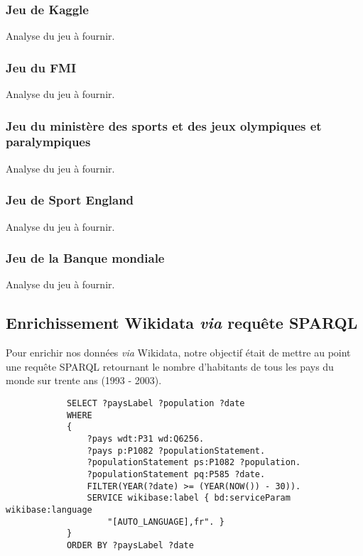 \documentclass[hidelinks, 12pt]{article}
\begin{document}
		\subsubsection{Jeu de Kaggle}
		
		Analyse du jeu à fournir.
		
		\subsubsection{Jeu du FMI}
		
		Analyse du jeu à fournir.
		
		\subsubsection{Jeu du ministère des sports et des jeux olympiques et paralympiques}
		
		Analyse du jeu à fournir.
		
		\subsubsection{Jeu de Sport England}

		Analyse du jeu à fournir.
		
		\subsubsection{Jeu de la Banque mondiale}
		
		Analyse du jeu à fournir.
		
		\subsection{Enrichissement Wikidata \emph{via} requête SPARQL}
		
		Pour enrichir nos données \emph{via} Wikidata, notre objectif était de mettre au point une requête SPARQL retournant le nombre d'habitants de tous les pays du monde sur trente ans (1993 - 2003).
		
		\begin{verbatim}
			SELECT ?paysLabel ?population ?date
			WHERE
			{
				?pays wdt:P31 wd:Q6256.
				?pays p:P1082 ?populationStatement.
				?populationStatement ps:P1082 ?population.
				?populationStatement pq:P585 ?date.
				FILTER(YEAR(?date) >= (YEAR(NOW()) - 30)).
				SERVICE wikibase:label { bd:serviceParam wikibase:language 
					"[AUTO_LANGUAGE],fr". }
			}
			ORDER BY ?paysLabel ?date
		\end{verbatim}
		
\end{document}

